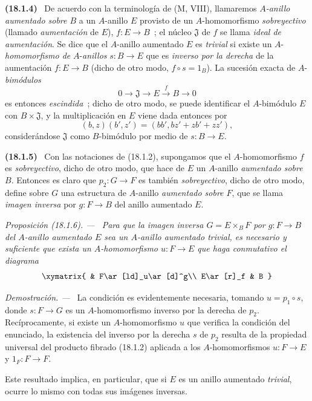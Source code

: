 \documentclass[10pt,oneside]{book}
\makeatletter
\newcommand{\setmanualcurrentlabel}[1]{\def\@currentlabel{#1}}
\newcommand{\oldpage}[2][]{%
  \setcounter{footnote}{0}%
  \marginpar{\scriptsize\textbf{#1}~|~#2}\ignorespaces}
\newenvironment{env}[1][]{\setmanualcurrentlabel{#1}\par\medskip\noindent\textbf{(#1)}\ }{\par}
\newenvironment{proposition}[1][]{%
  \setmanualcurrentlabel{#1}\par\medskip\noindent\itshape Proposición (#1). ---\ }{\par}
\newenvironment{proof}{%
  \par\medskip\noindent\textit{Demostración. ---\ }}{\par}
\makeatother
\begin{document}
\begin{env}[18.1.4]
\label{0.18.1.4-es}
De acuerdo con la terminología de (M, VIII), llamaremos
\emph{$A$-anillo aumentado sobre $B$} a un $A$-anillo $E$ provisto de un
$A$-homomorfismo \emph{sobreyectivo} (llamado \emph{aumentación} de $E$),
$f:E\to B$~; el núcleo $\mathfrak{J}$ de $f$ se llama
\emph{ideal de aumentación}. Se dice que el $A$-anillo aumentado $E$ es
\emph{trivial} si existe un $A$-\emph{homomorfismo de} $A$-\emph{anillos} $s:B\to E$
que es \emph{inverso por la derecha} de la aumentación $f:E\to B$ (dicho de otro modo,
$f\circ s=1_B$). La sucesión exacta de $A$-\emph{bimódulos}
\[
  0\longrightarrow\mathfrak{J}\longrightarrow E
  \xrightarrow{f}B\longrightarrow0
\]
\oldpage[0\textsubscript{IV-1}]{53}
es entonces \emph{escindida}~; dicho de otro modo, se puede identificar el $A$-bimódulo
$E$ con $B\times\mathfrak{J}$, y la multiplicación en $E$ viene dada entonces
por
\[
  (b,z)(b',z')=(bb',bz'+zb'+zz'),
\]
considerándose $\mathfrak{J}$ como $B$-bimódulo por medio de $s:B\to E$.
\end{env}

\begin{env}[18.1.5]
\label{0.18.1.5-es}
Con las notaciones de (18.1.2), supongamos que el $A$-homomorfismo $f$ es
\emph{sobreyectivo}, dicho de otro modo, que hace de $E$ un $A$-anillo \emph{aumentado sobre
$B$}. Entonces es claro que $p_2:G\to F$ es también \emph{sobreyectivo},
dicho de otro modo, define sobre $G$ una estructura de $A$-anillo \emph{aumentado sobre
$F$}, que se llama \emph{imagen inversa} por $g:F\to B$ del anillo
aumentado $E$.
\end{env}

\begin{proposition}[18.1.6]
\label{0.18.1.6-es}
Para que la imagen inversa $G=E\times_BF$ por $g:F\to B$ del $A$-anillo
aumentado $E$ sea un $A$-anillo aumentado trivial, es necesario y suficiente que
exista un $A$-homomorfismo $u:F\to E$ que haga conmutativo el diagrama
\[
  \xymatrix{
    & F\ar[ld]_u\ar[d]^g\\
    E\ar[r]_f & B
  }
\]
\end{proposition}

\begin{proof}
La condición es evidentemente necesaria, tomando $u=p_1\circ s$, donde
$s:F\to G$ es un $A$-homomorfismo inverso por la derecha de $p_2$. Recíprocamente,
si existe un $A$-homomorfismo $u$ que verifica la condición del enunciado,
la existencia del inverso por la derecha $s$ de $p_2$ resulta de la propiedad
universal del producto fibrado (18.1.2) aplicada a los $A$-homomorfismos
$u:F\to E$ y $1_F:F\to F$.

Este resultado implica, en particular, que si $E$ es un anillo aumentado
\emph{trivial}, ocurre lo mismo con todas sus imágenes inversas.
\end{proof}
\end{document}
